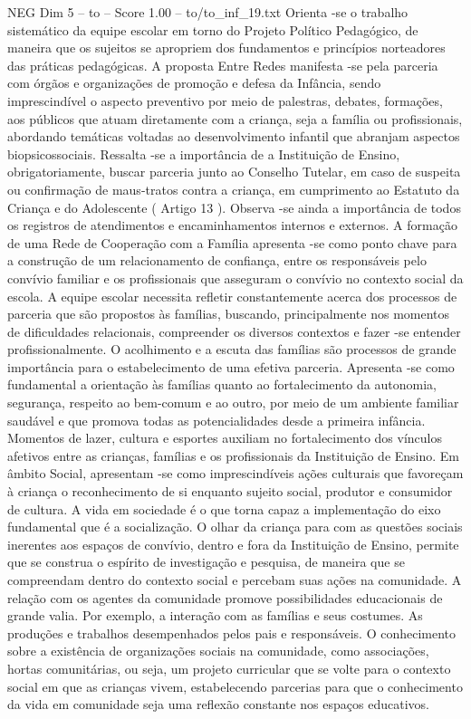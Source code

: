 \begin{textsample}{NEG Dim 5 – to – Score 1.00 – to/to\_inf\_19.txt}
Orienta -se o trabalho sistemático da equipe escolar em torno do Projeto Político Pedagógico, de maneira que os sujeitos se apropriem dos fundamentos e princípios norteadores das práticas pedagógicas.
A proposta Entre Redes manifesta -se pela parceria com órgãos e organizações de promoção e defesa da Infância, sendo imprescindível o aspecto preventivo por meio de palestras, debates, formações, aos públicos que atuam diretamente com a criança, seja a família ou profissionais, abordando temáticas voltadas ao desenvolvimento infantil que abranjam aspectos biopsicossociais.
Ressalta -se a importância de a Instituição de Ensino, obrigatoriamente, buscar parceria junto ao Conselho Tutelar, em caso de suspeita ou confirmação de maus-tratos contra a criança, em cumprimento ao Estatuto da Criança e do Adolescente ( Artigo 13 ).
Observa -se ainda a importância de todos os registros de atendimentos e encaminhamentos internos e externos.
A formação de uma Rede de Cooperação com a Família apresenta -se como ponto chave para a construção de um relacionamento de confiança, entre os responsáveis pelo convívio familiar e os profissionais que asseguram o convívio no contexto social da escola.
A equipe escolar necessita refletir constantemente acerca dos processos de parceria que são propostos às famílias, buscando, principalmente nos momentos de dificuldades relacionais, compreender os diversos contextos e fazer -se entender profissionalmente.
O acolhimento e a escuta das famílias são processos de grande importância para o estabelecimento de uma efetiva parceria.
Apresenta -se como fundamental a orientação às famílias quanto ao fortalecimento da autonomia, segurança, respeito ao bem-comum e ao outro, por meio de um ambiente familiar saudável e que promova todas as potencialidades desde a primeira infância.
Momentos de lazer, cultura e esportes auxiliam no fortalecimento dos vínculos afetivos entre as crianças, famílias e os profissionais da Instituição de Ensino.
Em âmbito Social, apresentam -se como imprescindíveis ações culturais que favoreçam à criança o reconhecimento de si enquanto sujeito social, produtor e consumidor de cultura.
A vida em sociedade é o que torna capaz a implementação do eixo fundamental que é a socialização.
O olhar da criança para com as questões sociais inerentes aos espaços de convívio, dentro e fora da Instituição de Ensino, permite que se construa o espírito de investigação e pesquisa, de maneira que se compreendam dentro do contexto social e percebam suas ações na comunidade.
A relação com os agentes da comunidade promove possibilidades educacionais de grande valia.
Por exemplo, a interação com as famílias e seus costumes.
As produções e trabalhos desempenhados pelos pais e responsáveis.
O conhecimento sobre a existência de organizações sociais na comunidade, como associações, hortas comunitárias, ou seja, um projeto curricular que se volte para o contexto social em que as crianças vivem, estabelecendo parcerias para que o conhecimento da vida em comunidade seja uma reflexão constante nos espaços educativos.

\end{textsample}
